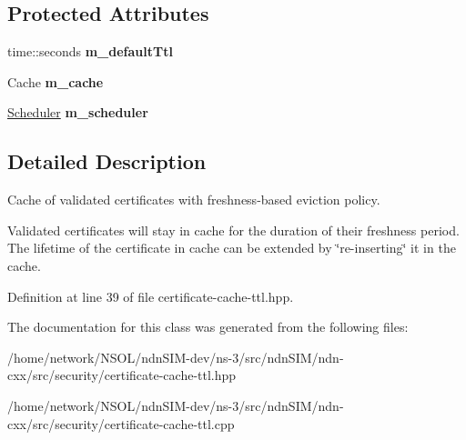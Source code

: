 \subsection*{Protected Attributes}
\begin{DoxyCompactItemize}
\item 
time\+::seconds {\bfseries m\+\_\+default\+Ttl}\hypertarget{classndn_1_1CertificateCacheTtl_a0ae7b1896108dc27abe1c365f0b42bee}{}\label{classndn_1_1CertificateCacheTtl_a0ae7b1896108dc27abe1c365f0b42bee}

\item 
Cache {\bfseries m\+\_\+cache}\hypertarget{classndn_1_1CertificateCacheTtl_a1c672b339275b6536de46349d62794dc}{}\label{classndn_1_1CertificateCacheTtl_a1c672b339275b6536de46349d62794dc}

\item 
\hyperlink{classndn_1_1util_1_1scheduler_1_1Scheduler}{Scheduler} {\bfseries m\+\_\+scheduler}\hypertarget{classndn_1_1CertificateCacheTtl_af9b575f0fd28a31085fcbc9a5df0c86f}{}\label{classndn_1_1CertificateCacheTtl_af9b575f0fd28a31085fcbc9a5df0c86f}

\end{DoxyCompactItemize}


\subsection{Detailed Description}
Cache of validated certificates with freshness-\/based eviction policy. 

Validated certificates will stay in cache for the duration of their freshness period. The lifetime of the certificate in cache can be extended by \char`\"{}re-\/inserting\char`\"{} it in the cache. 

Definition at line 39 of file certificate-\/cache-\/ttl.\+hpp.



The documentation for this class was generated from the following files\+:\begin{DoxyCompactItemize}
\item 
/home/network/\+N\+S\+O\+L/ndn\+S\+I\+M-\/dev/ns-\/3/src/ndn\+S\+I\+M/ndn-\/cxx/src/security/certificate-\/cache-\/ttl.\+hpp\item 
/home/network/\+N\+S\+O\+L/ndn\+S\+I\+M-\/dev/ns-\/3/src/ndn\+S\+I\+M/ndn-\/cxx/src/security/certificate-\/cache-\/ttl.\+cpp\end{DoxyCompactItemize}
